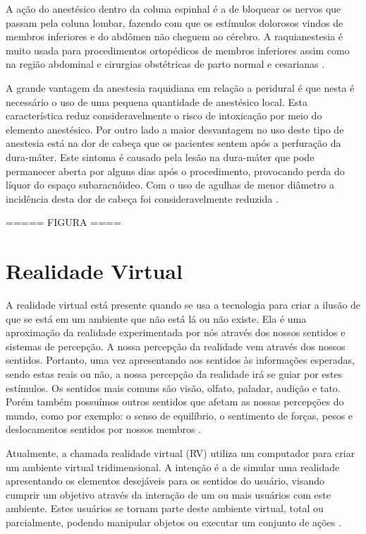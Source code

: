 A ação do anestésico dentro da coluna espinhal é a de bloquear os nervos que passam pela coluna lombar, fazendo com que os estímulos dolorosos vindos de membros inferiores e do abdômen não cheguem ao cérebro. A raquianestesia é muito usada para procedimentos ortopédicos de membros inferiores assim como na região abdominal e cirurgias obstétricas de parto normal e cesarianas \cite{Pinheiro2018}.

A grande vantagem da anestesia raquidiana em relação a peridural é que nesta é necessário o uso de uma pequena quantidade de anestésico local. Esta característica reduz consideravelmente o risco de intoxicação por meio do elemento anestésico. Por outro lado a maior desvantagem no uso deste tipo de anestesia está na dor de cabeça que os pacientes sentem após a perfuração da dura-máter. Este sintoma é causado pela lesão na dura-máter que pode permanecer aberta por alguns dias após o procedimento, provocando perda do líquor do espaço subaracnóideo. Com o uso de agulhas de menor diâmetro a incidência desta dor de cabeça foi consideravelmente reduzida \cite{INFOESCOLA2018}. 

===== FIGURA ====

\section{Realidade Virtual}

A realidade virtual está presente quando se usa a tecnologia para criar a ilusão de que se está em um ambiente que não está lá ou não existe. Ela é uma aproximação da realidade experimentada por nós através dos nossos sentidos e sistemas de percepção. A nossa percepção da realidade vem através dos nossos sentidos. Portanto, uma vez apresentando aos sentidos às informações esperadas, sendo estas reais ou não, a nossa percepção da realidade irá se guiar por estes estímulos. Os sentidos mais comuns são visão, olfato, paladar, audição e tato. Porém também possuímos outros sentidos que afetam as nossas percepções do mundo, como por exemplo: o senso de equilíbrio, o sentimento de forças, pesos e deslocamentos sentidos por nossos membros \cite{VRS2018}.

Atualmente, a chamada realidade virtual (RV) utiliza um computador para criar um ambiente virtual tridimensional. A intenção é a de simular uma realidade apresentando os elementos desejáveis para os sentidos do usuário, visando cumprir um objetivo através da interação de um ou mais usuários com este ambiente. Estes usuários se tornam parte deste ambiente virtual, total ou parcialmente, podendo manipular objetos ou executar um conjunto de ações \cite{VRS2018}.


